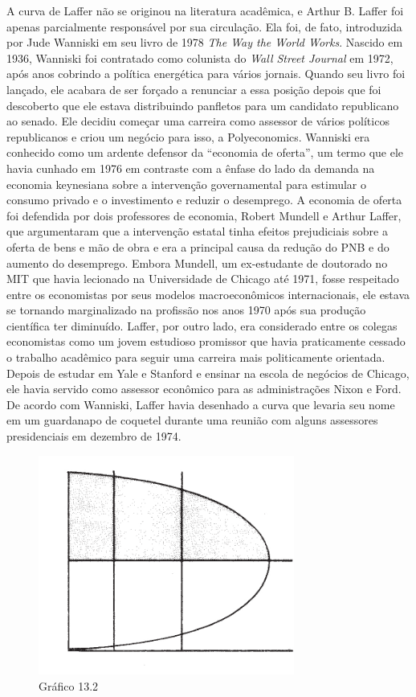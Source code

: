 \documentclass[12pt]{article}
\begin{document}
A curva de Laffer não se originou na literatura acadêmica, e Arthur B. Laffer foi apenas parcialmente responsável por sua circulação. Ela foi, de fato, introduzida por Jude Wanniski em seu livro de 1978 \textit{The Way the World Works}. Nascido em 1936, Wanniski foi contratado como colunista do \textit{Wall Street Journal} em 1972, após anos cobrindo a política energética para vários jornais. Quando seu livro foi lançado, ele acabara de ser forçado a renunciar a essa posição depois que foi descoberto que ele estava distribuindo panfletos para um candidato republicano ao senado. Ele decidiu começar uma carreira como assessor de vários políticos republicanos e criou um negócio para isso, a Polyeconomics. Wanniski era conhecido como um ardente defensor da ``economia de oferta'', um termo que ele havia cunhado em 1976 em contraste com a ênfase do lado da demanda na economia keynesiana sobre a intervenção governamental para estimular o consumo privado e o investimento e reduzir o desemprego. A economia de oferta foi defendida por dois professores de economia, Robert Mundell e Arthur Laffer, que argumentaram que a intervenção estatal tinha efeitos prejudiciais sobre a oferta de bens e mão de obra e era a principal causa da redução do PNB e do aumento do desemprego. Embora Mundell, um ex-estudante de doutorado no MIT que havia lecionado na Universidade de Chicago até 1971, fosse respeitado entre os economistas por seus modelos macroeconômicos internacionais, ele estava se tornando marginalizado na profissão nos anos 1970 após sua produção científica ter diminuído. Laffer, por outro lado, era considerado entre os colegas economistas como um jovem estudioso promissor que havia praticamente cessado o trabalho acadêmico para seguir uma carreira mais politicamente orientada. Depois de estudar em Yale e Stanford e ensinar na escola de negócios de Chicago, ele havia servido como assessor econômico para as administrações Nixon e Ford. De acordo com Wanniski, Laffer havia desenhado a curva que levaria seu nome em um guardanapo de coquetel durante uma reunião com alguns assessores presidenciais em dezembro de 1974.


\begin{figure}[H]
    \centering
    \caption{Gráfico 13.2}
    \includegraphics[width=0.75\textwidth]{4º Período/História do Pensamento Econômico/Tradução HPE/Tradução Tópico 9.3/figura 2.png}
    \end{figure}
\end{document}

